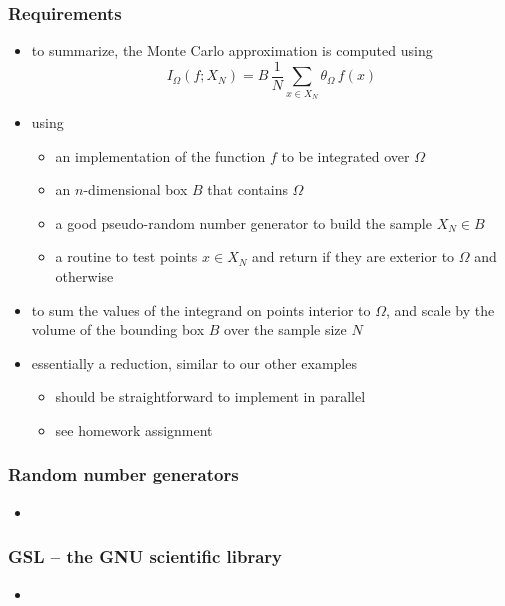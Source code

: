 \begin{frame}[fragile]
%
  \frametitle{Requirements}
%
  \begin{itemize}
%
  \item to summarize, the Monte Carlo approximation is computed using
%
    \begin{equation}
      I_{\Omega} (f; X_{N})
      =
      B \, \frac{1}{N} \sum_{x \in X_{N}} \theta_{\Omega} \, f(x)
    \end{equation}
%
  \item using
    \begin{itemize}
    \item an implementation of the function $f$ to be integrated over $\Omega$
    \item an $n$-dimensional box $B$ that contains $\Omega$
    \item a good pseudo-random number generator to build the sample $X_{N} \in B$
    \item a routine to test points $x \in X_{N}$ and return  if they are
      exterior to $\Omega$ and  otherwise
    \end{itemize}
%
  \item to sum the values of the integrand on points interior to $\Omega$, and scale by the
    volume of the bounding box $B$ over the sample size $N$
%
  \item essentially a reduction, similar to our other examples 
    \begin{itemize}
    \item should be straightforward to implement in parallel
    \item see homework assignment
    \end{itemize}
%
  \end{itemize}
%
\end{frame}

\begin{frame}[fragile]
%
  \frametitle{Random number generators}
%
  \begin{itemize}
%
  \item 
%
  \end{itemize}
%
\end{frame}

\begin{frame}[fragile]
%
  \frametitle{GSL -- the GNU scientific library}
%
  \begin{itemize}
%
  \item 
%
  \end{itemize}
%
\end{frame}

